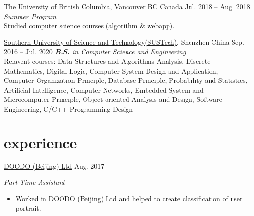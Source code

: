 \documentclass[hidelinks__VERSION__]{adamyi-cv}
\begin{document}
\begin{entrylist}


\entry
{\href{https://www.ubc.ca/}{The University of British Columbia}, Vancouver BC Canada}
{Jul. 2018 -- Aug. 2018}
{\emph{Summer Program}\\
Studied computer science courses (algorithm \& webapp).
}


\entry
{\href{https://www.sustech.edu.cn/}{Southern University of Science and Technology(SUSTech)}, Shenzhen China}
{Sep. 2016 -- Jul. 2020}
{\emph{\textbf{B.S.} in Computer Science and Engineering}\\
Relavent courses: Data Structures and Algorithms Analysis, Discrete Mathematics, Digital Logic, Computer System Design and Application, Computer Organization Principle, Database Principle, Probability and Statistics, Artificial Intelligence, Computer Networks, Embedded System and Microcomputer Principle, Object-oriented Analysis and Design, Software Engineering, C/C++ Programming Design
}

\end{entrylist}


\section{experience}

\begin{entrylist}


\entry
{\href{http://www.doodod.com/}{DOODO (Beijing) Ltd}}
{Aug. 2017}
{\emph{Part Time Assistant}
\begin{itemize}
\item Worked in DOODO (Beijing) Ltd and helped to create classification of user portrait.
\end{itemize}}


\end{entrylist}

\end{document}
